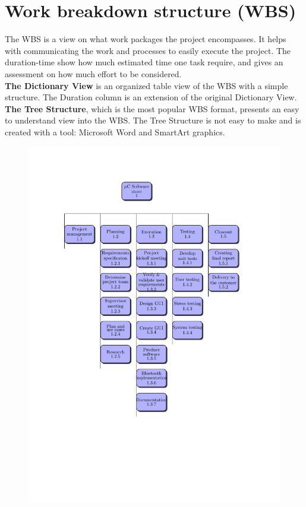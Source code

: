 \section{Work breakdown structure (WBS)}
The WBS is a view on what work packages the project encompasses. It helps with communicating the work and processes to easily execute the project. The duration-time show how much estimated time one task require, and gives an assessment on how much effort to be considered.\\
\newline
\textbf{The Dictionary View} is an organized table view of the WBS with a simple structure. The Duration column is an extension of the original Dictionary View.\\



\textbf{The Tree Structure}, which is the most popular WBS format, presents an easy to understand view into the WBS. The Tree Structure is not easy to make and is created with a tool: Microsoft Word and SmartArt graphics.\\
 
\begin{figure}[H]
\vspace*{-1.5in}
\hspace*{-1.2in}
\includegraphics[trim=0cm 4cm 0cm 0cm]{figures/wbs-tree.pdf}
\end{figure}